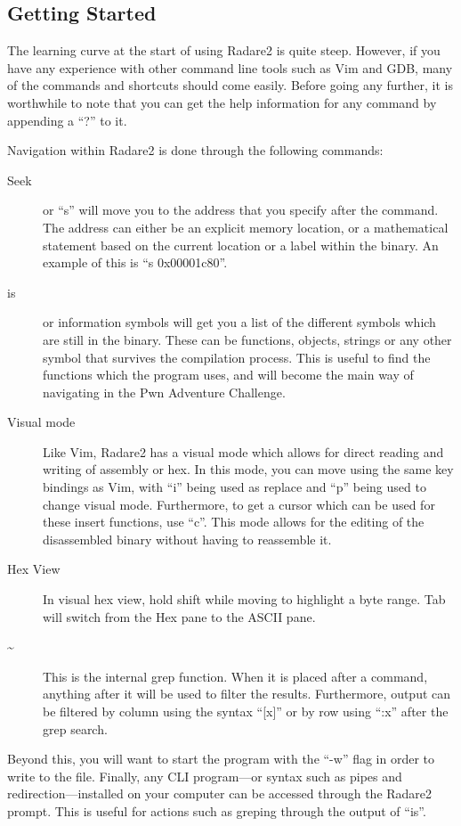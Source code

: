		\subsection{Getting Started}
			The learning curve at the start of using Radare2 is quite steep.
			However, if you have any experience with other command line tools such as Vim and GDB, many of the commands and shortcuts should come easily.
			Before going any further, it is worthwhile to note that you can get the help information for any command by appending a ``?'' to it.

			Navigation within Radare2 is done through the following commands:
			\begin{description}
				\item[Seek]
					or ``s'' will move you to the address that you specify after the command.
					The address can either be an explicit memory location, or a mathematical statement based on the current location or a label within the binary.
					An example of this is ``s 0x00001c80''.
				\item[is]
					or information symbols will get you a list of the different symbols which are still in the binary.
					These can be functions, objects, strings or any other symbol that survives the compilation process.
					This is useful to find the functions which the program uses, and will become the main way of navigating in the Pwn Adventure Challenge.
				\item[Visual mode]
					Like Vim, Radare2 has a visual mode which allows for direct reading and writing of assembly or hex.
					In this mode, you can move using the same key bindings as Vim, with ``i'' being used as replace and ``p'' being used to change visual mode.
					Furthermore, to get a cursor which can be used for these insert functions, use ``c''.
					This mode allows for the editing of the disassembled binary without having to reassemble it.
				\item[Hex View]
					In visual hex view, hold shift while moving to highlight a byte range.
					Tab will switch from the Hex pane to the ASCII pane.
				\item[\~{}]
					This is the internal grep function.
					When it is placed after a command, anything after it will be used to filter the results.
					Furthermore, output can be filtered by column using the syntax ``[x]'' or by row using ``:x'' after the grep search.
			\end{description}
			Beyond this, you will want to start the program with the ``-w'' flag in order to write to the file.
			Finally, any CLI program---or syntax such as pipes and redirection---installed on your computer can be accessed through the Radare2 prompt.
			This is useful for actions such as greping through the output of ``is''.

